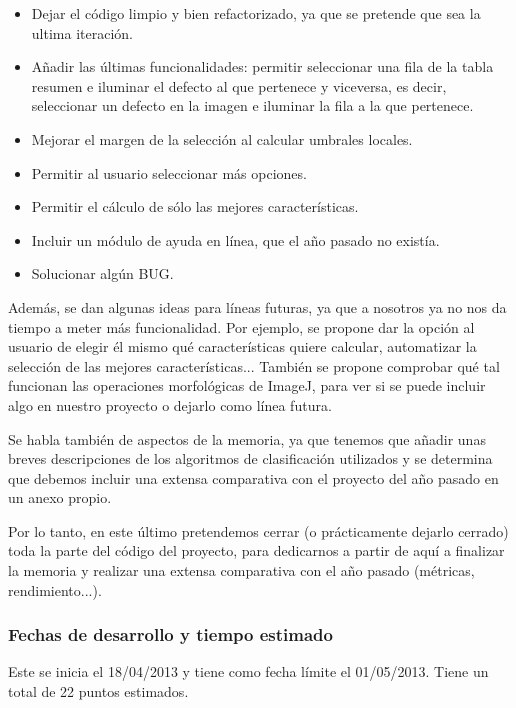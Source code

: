 \begin{itemize}
\item Dejar el código limpio y bien refactorizado, ya que se pretende que sea la ultima iteración.
\item Añadir las últimas funcionalidades: permitir seleccionar una fila de la tabla resumen e iluminar el defecto al que pertenece y viceversa, es decir, seleccionar un defecto en la imagen e iluminar la fila a la que pertenece.
\item Mejorar el margen de la selección al calcular umbrales locales.
\item Permitir al usuario seleccionar más opciones.
\item Permitir el cálculo de sólo las mejores características.
\item Incluir un módulo de ayuda en línea, que el año pasado no existía.
\item Solucionar algún BUG.
\end{itemize}

Además, se dan algunas ideas para líneas futuras, ya que a nosotros ya no nos da tiempo a meter más funcionalidad. Por ejemplo, se propone dar la opción al usuario de elegir él mismo qué características quiere calcular, automatizar la selección de las mejores características... También se propone comprobar qué tal funcionan las operaciones morfológicas de ImageJ, para ver si se puede incluir algo en nuestro proyecto o dejarlo como línea futura.

Se habla también de aspectos de la memoria, ya que tenemos que añadir unas breves descripciones de los algoritmos de clasificación utilizados y se determina que debemos incluir una extensa comparativa con el proyecto del año pasado en un anexo propio.

Por lo tanto, en este último \sprint{} pretendemos cerrar (o prácticamente dejarlo cerrado) toda la parte del código del proyecto, para dedicarnos a partir de aquí a finalizar la memoria y realizar una extensa comparativa con el año pasado (métricas, rendimiento...).


\subsubsection*{Fechas de desarrollo y tiempo estimado}
Este \sprint{} se inicia el 18/04/2013 y tiene como fecha límite el 01/05/2013. Tiene un total de 22 puntos estimados.


